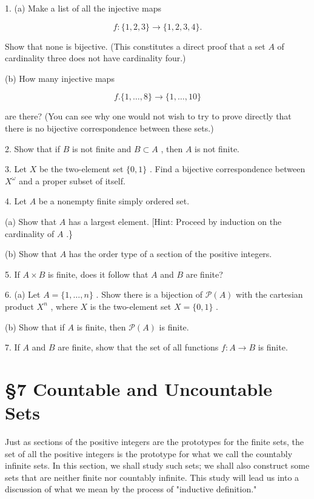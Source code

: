 \documentclass[10pt]{article}
\begin{document}
1. (a) Make a list of all the injective maps

\[
f : \{ 1,2,3\}  \rightarrow  \{ 1,2,3,4\} .
\]

Show that none is bijective. (This constitutes a direct proof that a set \(A\) of cardinality three does not have cardinality four.)

(b) How many injective maps

\[
f.\{ 1,\ldots ,8\}  \rightarrow  \{ 1,\ldots ,{10}\}
\]

are there? (You can see why one would not wish to try to prove directly that there is no bijective correspondence between these sets.)

2. Show that if \(B\) is not finite and \(B \subset  A\) , then \(A\) is not finite.

3. Let \(X\) be the two-element set \(\{ 0,1\}\) . Find a bijective correspondence between \({X}^{\omega }\) and a proper subset of itself.

4. Let \(A\) be a nonempty finite simply ordered set.

(a) Show that \(A\) has a largest element. [Hint: Proceed by induction on the cardinality of \(A\) .\}

(b) Show that \(A\) has the order type of a section of the positive integers.

5. If \(A \times  B\) is finite, does it follow that \(A\) and \(B\) are finite?

6. (a) Let \(A = \{ 1,\ldots ,n\}\) . Show there is a bijection of \(\mathcal{P}\left( A\right)\) with the cartesian product \({X}^{n}\) , where \(X\) is the two-element set \(X = \{ 0,1\}\) .

(b) Show that if \(A\) is finite, then \(\mathcal{P}\left( A\right)\) is finite.

7. If \(A\) and \(B\) are finite, show that the set of all functions \(f : A \rightarrow  B\) is finite.

\section*{§7 Countable and Uncountable Sets}

Just as sections of the positive integers are the prototypes for the finite sets, the set of all the positive integers is the prototype for what we call the countably infinite sets. In this section, we shall study such sets; we shall also construct some sets that are neither finite nor countably infinite. This study will lead us into a discussion of what we mean by the process of "inductive definition."
\end{document}
